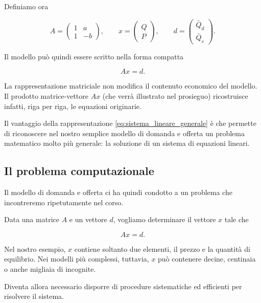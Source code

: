 Definiamo ora

\begin{equation*}
    A =
    \begin{pmatrix}
        1 & a \\
        1 & -b
    \end{pmatrix},
    \qquad
    x =
    \begin{pmatrix}
        Q \\
        P
    \end{pmatrix},
    \qquad
    d =
    \begin{pmatrix}
        \bar{Q}_d \\
        \bar{Q}_s
    \end{pmatrix}.
\end{equation*}

Il modello può quindi essere scritto nella forma compatta

\begin{equation}
    Ax=d.
    \label{eq:sistema_lineare_generale}
\end{equation}

La rappresentazione matriciale non modifica il contenuto economico
del modello. Il prodotto matrice-vettore $Ax$ (che verrà illustrato nel prosieguo) ricostruisce infatti,
riga per riga, le equazioni originarie.

Il vantaggio della rappresentazione \eqref{eq:sistema_lineare_generale}
è che permette di riconoscere nel nostro semplice modello di domanda
e offerta un problema matematico molto più generale: la soluzione
di un sistema di equazioni lineari.

\subsection{Il problema computazionale}

Il modello di domanda e offerta ci ha quindi condotto a un problema
che incontreremo ripetutamente nel corso.

Data una matrice $A$ e un vettore $d$, vogliamo determinare il
vettore $x$ tale che

\begin{equation*}
    Ax=d.
\end{equation*}

Nel nostro esempio, $x$ contiene soltanto due elementi, il prezzo
e la quantità di equilibrio. Nei modelli più complessi, tuttavia,
$x$ può contenere decine, centinaia o anche migliaia di incognite.

Diventa allora necessario disporre di procedure sistematiche ed
efficienti per risolvere il sistema.

